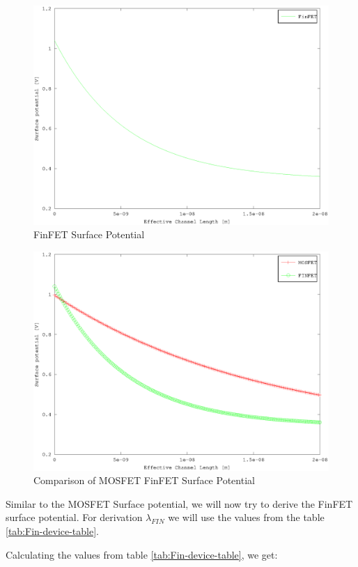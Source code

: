 \documentclass[a4paper]{article}
\begin{document}
\begin{figure}[!h]
  \includegraphics[width=\linewidth,height=0.65\linewidth]{./FinFET_surface_potential_graph.eps}
  \caption{FinFET Surface Potential}
  \label{fig:Fin-surf-pot-graph}
\end{figure}

\begin{figure}[!h]
  \includegraphics[width=\linewidth,height=0.65\linewidth]{./MOSFET_FinFET_surface_potential_graph.eps}
  \caption{Comparison of MOSFET FinFET Surface Potential}
  \label{fig:MOS-Fin-surf-pot-graph}
\end{figure}

Similar to the MOSFET Surface potential, we will now try to derive the FinFET surface potential. For derivation $\lambda_{FIN}$ we will use the values from the table \ref{tab:Fin-device-table}.

Calculating the values from table \ref{tab:Fin-device-table}, we get:
\end{document}
